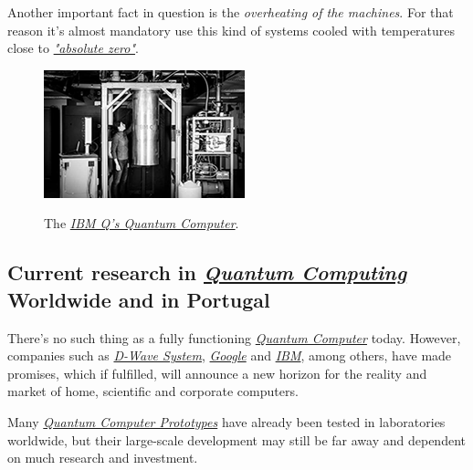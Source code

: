 \documentclass[conference]{IEEEtran}
\begin{document}
\vspace{4pt}

Another important fact in question is the \textit{overheating of the machines}. For that reason it's almost mandatory use this kind of systems cooled with temperatures close to \href{https://en.wikipedia.org/wiki/Absolute_zero}{\textit{"absolute zero"}}.

\vspace{4pt}

\begin{center}
  \begin{figure}[htbp]
    \centerline{\href{https://www.research.ibm.com/ibm-q/}{\includegraphics{imgs/fig-7.png}}}
    \caption{The \href{https://www.research.ibm.com/ibm-q/}{\textit{IBM Q's Quantum Computer}}.}
    \label{fig}
  \end{figure}
\end{center}

\subsection{Current research in \href{https://en.wikipedia.org/wiki/Quantum_computing}{\textit{Quantum Computing}} Worldwide and in Portugal}\label{AA}

\vspace{4pt}

There's no such thing as a fully functioning \href{https://en.wikipedia.org/wiki/Quantum_computing}{\textit{Quantum Computer}} today. However, companies such as \href{https://en.wikipedia.org/wiki/D-Wave_Systems}{\textit{D-Wave System}}, \href{https://en.wikipedia.org/wiki/Google}{\textit{Google}} and \href{https://en.wikipedia.org/wiki/IBM}{\textit{IBM}}, among others, have made promises, which if fulfilled, will announce a new horizon for the reality and market of home, scientific and corporate computers.

\vspace{4pt}

Many \href{https://en.wikipedia.org/wiki/Quantum_computing}{\textit{Quantum Computer Prototypes}} have already been tested in laboratories worldwide, but their large-scale development may still be far away and dependent on much research and investment.
\end{document}
